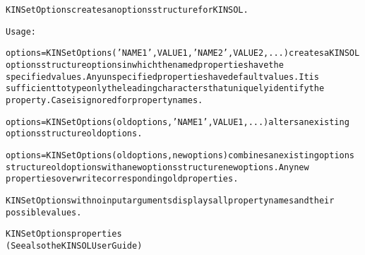 \begin{alltt}
KINSetOptions creates an options structure for KINSOL.

   Usage:

   options = KINSetOptions('NAME1',VALUE1,'NAME2',VALUE2,...) creates a KINSOL
   options structure options in which the named properties have the
   specified values. Any unspecified properties have default values. It is
   sufficient to type only the leading characters that uniquely identify the
   property. Case is ignored for property names. 
   
   options = KINSetOptions(oldoptions,'NAME1',VALUE1,...) alters an existing 
   options structure oldoptions.
   
   options = KINSetOptions(oldoptions,newoptions) combines an existing options 
   structure oldoptions with a new options structure newoptions. Any new 
   properties overwrite corresponding old properties. 
   
   KINSetOptions with no input arguments displays all property names and their
   possible values.
   
KINSetOptions properties
(See also the KINSOL User Guide)


\end{alltt}
